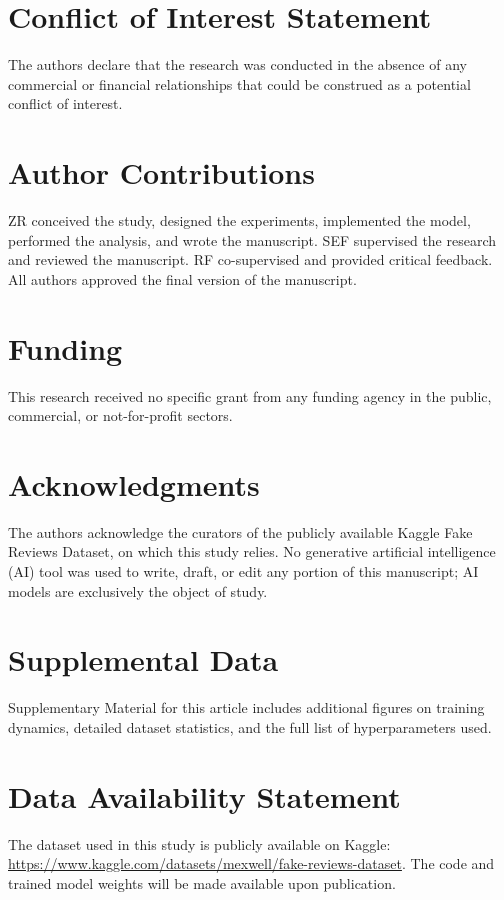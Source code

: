 \documentclass[utf8]{FrontiersinHarvard}
\begin{document}

\section*{Conflict of Interest Statement}
The authors declare that the research was conducted in the absence of any commercial or financial relationships that could be construed as a potential conflict of interest.

\section*{Author Contributions}
ZR conceived the study, designed the experiments, implemented the model, performed the analysis, and wrote the manuscript. SEF supervised the research and reviewed the manuscript. RF co-supervised and provided critical feedback. All authors approved the final version of the manuscript.

\section*{Funding}
This research received no specific grant from any funding agency in the public, commercial, or not-for-profit sectors.

\section*{Acknowledgments}
The authors acknowledge the curators of the publicly available Kaggle Fake Reviews Dataset, on which this study relies. No generative artificial intelligence (AI) tool was used to write, draft, or edit any portion of this manuscript; AI models are exclusively the object of study.

\section*{Supplemental Data}
Supplementary Material for this article includes additional figures on training dynamics, detailed dataset statistics, and the full list of hyperparameters used.

\section*{Data Availability Statement}
The dataset used in this study is publicly available on Kaggle: \url{https://www.kaggle.com/datasets/mexwell/fake-reviews-dataset}. The code and trained model weights will be made available upon publication.
\end{document}
